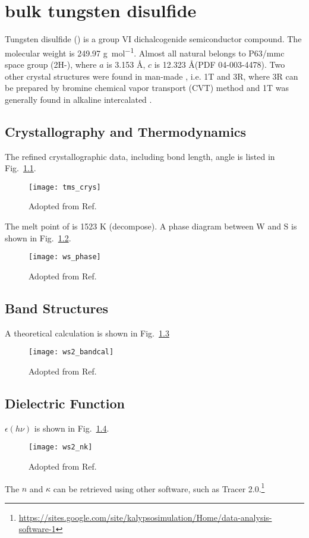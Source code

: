\chapter{bulk tungsten disulfide}


Tungsten disulfide () is a group VI dichalcogenide semiconductor compound. The molecular weight is 249.97 \si{g\per \mole}. Almost all natural  belongs to P63/mmc space group (2H-), where $a$ is 3.153 \AA, $c$ is 12.323 \AA (PDF 04-003-4478). Two other crystal structures were found in man-made , i.e. 1T and 3R, where 3R can be prepared by bromine chemical vapor transport (CVT) method \cite{Schutte1987} and 1T was generally found in alkaline intercalated .\cite{Yang1996a, Enyashin2011}


\section{Crystallography and Thermodynamics}

The refined crystallographic data, including bond length, angle is listed in Fig.~\ref{app:bond}. 

\begin{figure}[htb]
\centering
\texttt{[image: tms\_crys]}
\caption{Adopted from Ref.\cite{Schutte1987}}
\label{app:bond}
\end{figure}

The melt point of  is 1523 K (decompose). A phase diagram between W and S is shown in Fig.~\ref{app:pd}. 

\begin{figure}[htb]
\centering
\texttt{[image: ws\_phase]}
\caption{Adopted from Ref.\cite{Tenne1995,Tenne1998}}
\label{app:pd}
\end{figure}

\section{Band Structures}

A theoretical calculation is shown in Fig.~\ref{app:band} 
\begin{figure}[htb]
\centering
\texttt{[image: ws2\_bandcal]}
\caption{Adopted from Ref.\cite{Kuc2011}}
\label{app:band}
\end{figure}



\section{Dielectric Function}


$\epsilon(h\nu)$ is shown in Fig.~\ref{app:nk}. 
\begin{figure}[htb]
\centering
\texttt{[image: ws2\_nk]}
\caption{Adopted from Ref.\cite{Hughes1976}}
\label{app:nk}
\end{figure}

The $n$ and $\kappa$ can be retrieved using other software, such as Tracer 2.0.\footnote{\url{https://sites.google.com/site/kalypsosimulation/Home/data-analysis-software-1}}




